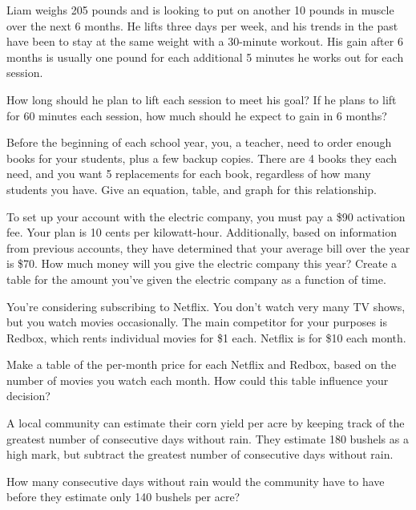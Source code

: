 \begin{exercise}
Liam weighs 205 pounds and is looking to put on another 10 pounds in muscle over the next 6 months.  He lifts three days per week, and his trends in the past have been to stay at the same weight with a 30-minute workout.  His gain after 6 months is usually one pound for each additional 5 minutes he works out for each session.

How long should he plan to lift each session to meet his goal?
If he plans to lift for 60 minutes each session, how much should he expect to gain in 6 months?
\end{exercise}
\bigskip

\begin{exercise}
Before the beginning of each school year, you, a teacher, need to order enough books for your students, plus a few backup copies.  There are 4 books they each need, and you want 5 replacements for each book, regardless of how many students you have.  Give an equation, table, and graph for this relationship.
\end{exercise}


\pagebreak
\begin{exercise}
To set up your account with the electric company, you must pay a \$90 activation fee.  Your plan is 10 cents per kilowatt-hour.  Additionally, based on information from previous accounts, they have determined that your average bill over the year is \$70.  How much money will you give the electric company this year?  Create a table for the amount you've given the electric company as a function of time.
\end{exercise}



\begin{exercise}
You're considering subscribing to Netflix.  You don't watch very many TV shows, but you watch movies occasionally.  The main competitor for your purposes is Redbox, which rents individual movies for \$1 each.  Netflix is for \$10 each month.

Make a table of the per-month price for each Netflix and Redbox, based on the number of movies you watch each month.  How could this table influence your decision?

\end{exercise}

\begin{exercise}
A local community can estimate their corn yield per acre by keeping track of the greatest number of consecutive days without rain.  They estimate 180 bushels as a high mark, but subtract the greatest number of consecutive days without rain.

How many consecutive days without rain would the community have to have before they estimate only 140 bushels per acre?
\end{exercise}
\bigskip

